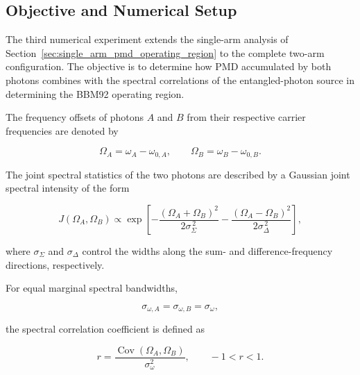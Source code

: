 
\subsection{Objective and Numerical Setup}

The third numerical experiment extends the single-arm analysis of
Section~\ref{sec:single_arm_pmd_operating_region} to the complete two-arm
configuration. The objective is to determine how PMD accumulated by both photons
combines with the spectral correlations of the entangled-photon source in
determining the BBM92 operating region.

The frequency offsets of photons \(A\) and \(B\) from their respective carrier
frequencies are denoted by

\begin{equation}
\Omega_A
=
\omega_A-\omega_{0,A},
\qquad
\Omega_B
=
\omega_B-\omega_{0,B}.
\label{eq:exp3_frequency_offsets}
\end{equation}

The joint spectral statistics of the two photons are described by a Gaussian
joint spectral intensity of the form

\begin{equation}
J(\Omega_A,\Omega_B)
\propto
\exp
\left[
-
\frac{(\Omega_A+\Omega_B)^2}
     {2\sigma_{\Sigma}^{\,2}}
-
\frac{(\Omega_A-\Omega_B)^2}
     {2\sigma_{\Delta}^{\,2}}
\right],
\label{eq:exp3_gaussian_jsi}
\end{equation}

where \(\sigma_{\Sigma}\) and \(\sigma_{\Delta}\) control the widths along the
sum- and difference-frequency directions, respectively.

For equal marginal spectral bandwidths,

\begin{equation}
\sigma_{\omega,A}
=
\sigma_{\omega,B}
=
\sigma_\omega,
\end{equation}

the spectral correlation coefficient is defined as

\begin{equation}
\boxed{
r
=
\frac{
\operatorname{Cov}(\Omega_A,\Omega_B)
}{
\sigma_\omega^2
},
\qquad
-1<r<1.
}
\label{eq:exp3_spectral_correlation_coefficient}
\end{equation}

